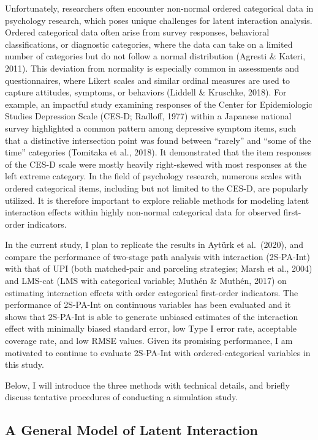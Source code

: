 \documentclass[
  11pt,
  man]{apa6}
\begin{document}
Unfortunately, researchers often encounter non-normal ordered categorical data in psychology research, which poses unique challenges for latent interaction analysis. Ordered categorical data often arise from survey responses, behavioral classifications, or diagnostic categories, where the data can take on a limited number of categories but do not follow a normal distribution (Agresti \& Kateri, 2011). This deviation from normality is especially common in assessments and questionnaires, where Likert scales and similar ordinal measures are used to capture attitudes, symptoms, or behaviors (Liddell \& Kruschke, 2018). For example, an impactful study examining responses of the Center for Epidemiologic Studies Depression Scale (CES-D; Radloff, 1977) within a Japanese national survey highlighted a common pattern among depressive symptom items, such that a distinctive intersection point was found between ``rarely'' and ``some of the time'' categories (Tomitaka et al., 2018). It demonstrated that the item responses of the CES-D scale were mostly heavily right-skewed with most responses at the left extreme category. In the field of psychology research, numerous scales with ordered categorical items, including but not limited to the CES-D, are popularly utilized. It is therefore important to explore reliable methods for modeling latent interaction effects within highly non-normal categorical data for observed first-order indicators.

In the current study, I plan to replicate the results in Aytürk et al.~(2020), and compare the performance of two-stage path analysis with interaction (2S-PA-Int) with that of UPI (both matched-pair and parceling strategies; Marsh et al., 2004) and LMS-cat (LMS with categorical variable; Muthén \& Muthén, 2017) on estimating interaction effects with order categorical first-order indicators. The performance of 2S-PA-Int on continuous variables has been evaluated and it shows that 2S-PA-Int is able to generate unbiased estimates of the interaction effect with minimally biased standard error, low Type I error rate, acceptable coverage rate, and low RMSE values. Given its promising performance, I am motivated to continue to evaluate 2S-PA-Int with ordered-categorical variables in this study.

Below, I will introduce the three methods with technical details, and briefly discuss tentative procedures of conducting a simulation study.

\hypertarget{a-general-model-of-latent-interaction}{%
\subsection{A General Model of Latent Interaction}\label{a-general-model-of-latent-interaction}}
\end{document}
